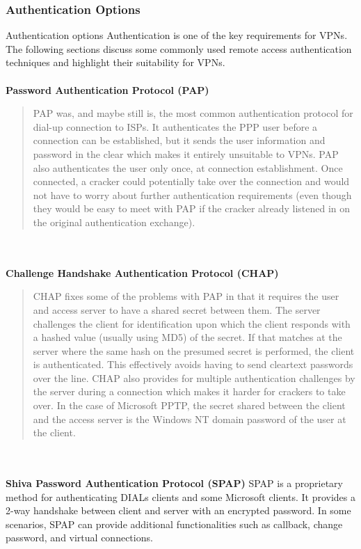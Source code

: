 \documentclass[10pt,a4paper]{article}
\begin{document}
\begin{itemize}
\begin{itemize}
\subsubsection{Authentication Options}
Authentication options
Authentication is one of the key requirements for VPNs. The following sections
discuss some commonly used remote access authentication techniques and
highlight their suitability for VPNs.
\\
\\
\textbf{Password Authentication Protocol (PAP)}
\begin{quote}
PAP was, and maybe still is, the most common authentication protocol for dial-up
connection to ISPs. It authenticates the PPP user before a connection can be
established, but it sends the user information and password in the clear which
makes it entirely unsuitable to VPNs. PAP also authenticates the user only once,
at connection establishment. Once connected, a cracker could potentially take
over the connection and would not have to worry about further authentication
requirements (even though they would be easy to meet with PAP if the cracker
already listened in on the original authentication exchange).
\end{quote}
\\
\\
\textbf{Challenge Handshake Authentication Protocol (CHAP)}
\begin{quote}
CHAP fixes some of the problems with PAP in that it requires the user and access
server to have a shared secret between them. The server challenges the client
for identification upon which the client responds with a hashed value (usually
using MD5) of the secret. If that matches at the server where the same hash on the presumed secret is performed, the client is authenticated. This effectively
avoids having to send cleartext passwords over the line. CHAP also provides for
multiple authentication challenges by the server during a connection which
makes it harder for crackers to take over. In the case of Microsoft PPTP, the
secret shared between the client and the access server is the Windows NT
domain password of the user at the client.
\end{quote}
\\
\\
\textbf{Shiva Password Authentication Protocol (SPAP)}
SPAP is a proprietary method for authenticating DIALs clients and some
Microsoft clients. It provides a 2-way handshake between client and server with
an encrypted password. In some scenarios, SPAP can provide additional
functionalities such as callback, change password, and virtual connections.
\\
\\


\end{itemize}
\end{itemize}
\end{document}
